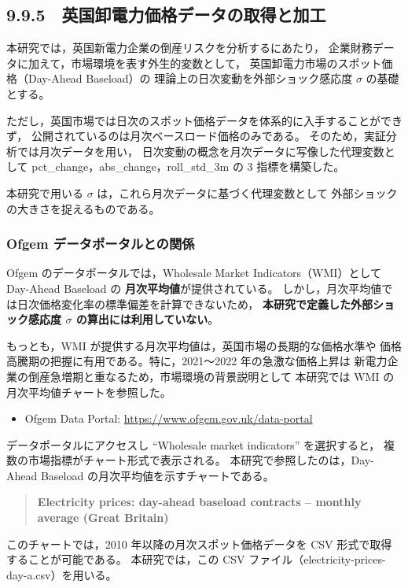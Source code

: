 \subsection*{9.9.5　英国卸電力価格データの取得と加工}

本研究では，英国新電力企業の倒産リスクを分析するにあたり，
企業財務データに加えて，市場環境を表す外生的変数として，
英国卸電力市場のスポット価格（Day-Ahead Baseload）の
理論上の日次変動を外部ショック感応度 $\sigma$ の基礎とする。

ただし，英国市場では日次のスポット価格データを体系的に入手することができず，
公開されているのは月次ベースロード価格のみである。
そのため，実証分析では月次データを用い，
日次変動の概念を月次データに写像した代理変数として
pct\_change，abs\_change，roll\_std\_3m の 3 指標を構築した。

本研究で用いる $\sigma$ は，これら月次データに基づく代理変数として
外部ショックの大きさを捉えるものである。

\subsubsection*{Ofgem データポータルとの関係}

Ofgem のデータポータルでは，Wholesale Market Indicators（WMI）として
Day-Ahead Baseload の \textbf{月次平均値}が提供されている。
しかし，月次平均値では日次価格変化率の標準偏差を計算できないため，
\textbf{本研究で定義した外部ショック感応度 $\sigma$ の算出には利用していない}。

もっとも，WMI が提供する月次平均値は，英国市場の長期的な価格水準や
価格高騰期の把握に有用である。特に，2021～2022 年の急激な価格上昇は
新電力企業の倒産急増期と重なるため，市場環境の背景説明として
本研究では WMI の月次平均値チャートを参照した。

\begin{itemize}
  \item Ofgem Data Portal: \url{https://www.ofgem.gov.uk/data-portal}
\end{itemize}

データポータルにアクセスし ``Wholesale market indicators'' を選択すると，
複数の市場指標がチャート形式で表示される。
本研究で参照したのは，Day-Ahead Baseload の月次平均値を示すチャートである。

\begin{quote}
\textbf{Electricity prices: day-ahead baseload contracts -- monthly average (Great Britain)}
\end{quote}

このチャートでは，2010 年以降の月次スポット価格データを
CSV 形式で取得することが可能である。
本研究では，この CSV ファイル（electricity-prices-day-a.csv）を用いる。

